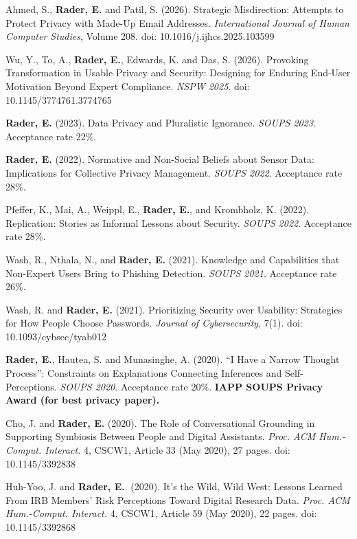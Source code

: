 \documentclass[9pt]{extarticle}
\begin{document}
Ahmed, S., \textbf{Rader, E.} and Patil, S. (2026). Strategic Misdirection: Attempts to Protect Privacy with Made-Up Email Addresses. \emph{International Journal of Human Computer Studies}, Volume 208. doi: 10.1016/j.ijhcs.2025.103599

Wu, Y., To, A., \textbf{Rader, E.}, Edwards, K. and Das, S. (2026). Provoking Transformation in Usable Privacy and Security: Designing for Enduring End-User Motivation Beyond Expert Compliance. \emph{NSPW 2025}. doi: 10.1145/3774761.3774765

\textbf{Rader, E.} (2023). Data Privacy and Pluralistic Ignorance. \emph{SOUPS 2023}. Acceptance rate 22\%.

\textbf{Rader, E.} (2022). Normative and Non-Social Beliefs about Sensor Data: Implications for Collective Privacy Management. \emph{SOUPS 2022}. Acceptance rate 28\%.

Pfeffer, K., Mai, A., Weippl, E., \textbf{Rader, E.}, and  Krombholz, K. (2022). Replication: Stories as Informal Lessons about Security. \emph{SOUPS 2022}. Acceptance rate 28\%.

Wash, R., Nthala, N., and \textbf{Rader, E.} (2021). Knowledge and Capabilities that Non-Expert Users Bring to Phishing Detection. \emph{SOUPS 2021}. Acceptance rate 26\%. 

Wash, R. and \textbf{Rader, E.} (2021). Prioritizing Security over Usability: Strategies for How People Choose Passwords. \emph{Journal of Cybersecurity}, 7(1). doi: 10.1093/cybsec/tyab012

\textbf{Rader, E.}, Hautea, S. and Munasinghe, A. (2020). ``I Have a Narrow Thought Process'': Constraints on Explanations Connecting Inferences and Self-Perceptions. \emph{SOUPS 2020}. Acceptance rate 20\%. \textbf{IAPP SOUPS Privacy Award (for best privacy paper).}

Cho, J. and \textbf{Rader, E.} (2020). The Role of Conversational Grounding in Supporting Symbiosis Between People and Digital Assistants. \emph{Proc. ACM Hum.-Comput. Interact.} 4, CSCW1, Article 33 (May 2020), 27 pages. doi: 10.1145/3392838

Huh-Yoo, J. and \textbf{Rader, E.}. (2020). It's the Wild, Wild West: Lessons Learned From IRB Members' Risk Perceptions Toward Digital Research Data. \emph{Proc. ACM Hum.-Comput. Interact.} 4, CSCW1, Article 59 (May 2020), 22 pages. doi: 10.1145/3392868
\end{document}
